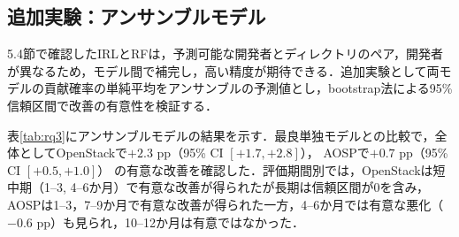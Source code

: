 \documentclass[submit,noauthor,ses,dvipdfmx]{ipsj}
\begin{document}

\vspace{-5mm}
\subsection{追加実験：アンサンブルモデル}\label{sec:ensemble}
5.4節で確認したIRLとRFは，予測可能な開発者とディレクトリのペア，開発者が異なるため，モデル間で補完し，高い精度が期待できる．追加実験として両モデルの貢献確率の単純平均をアンサンブルの予測値とし，bootstrap法による95\%信頼区間で改善の有意性を検証する．

表\ref{tab:rq3}にアンサンブルモデルの結果を示す．最良単独モデルとの比較で，全体としてOpenStackで$+2.3$ pp（95\% CI $[+1.7, +2.8]$）， AOSPで$+0.7$ pp（95\% CI $[+0.5, +1.0]$） の有意な改善を確認した．評価期間別では，OpenStackは短中期（1--3, 4--6か月）で有意な改善が得られたが長期は信頼区間が0を含み， AOSPは1--3，7--9か月で有意な改善が得られた一方，4--6か月では有意な悪化（$-0.6$ pp）も見られ，10--12か月は有意ではなかった．
\end{document}
